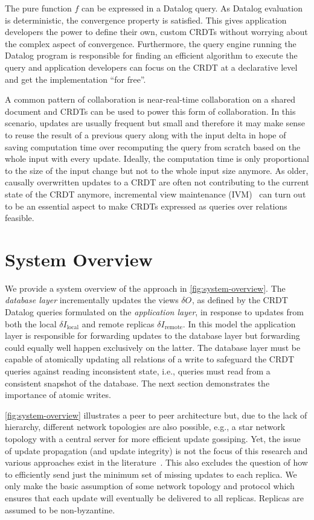 \documentclass{article}
\newcommand{\deltaI}[1]{\(\delta I_{\text{#1}}\)}
\newcommand{\deltaO}[1][]{\(\delta O_{\text{#1}}\)}
\begin{document}
The pure function \( f \) can be expressed in a Datalog query.
As Datalog evaluation is deterministic, the convergence property is satisfied.
This gives application developers the power to define their own, custom CRDTs
without worrying about the complex aspect of convergence.
Furthermore, the query engine running the Datalog program is responsible
for finding an efficient algorithm to execute the query and application developers
can focus on the CRDT at a declarative level and get the implementation ``for free''.

A common pattern of collaboration is near-real-time collaboration on a shared
document and CRDTs can be used to power this form of collaboration.
In this scenario, updates are usually frequent but small and therefore it
may make sense to reuse the result of a previous query along with the input
delta in hope of saving computation time over recomputing the query from scratch
based on the whole input with every update.
Ideally, the computation time is only proportional to the size of the input
change but not to the whole input size anymore.
As older, causally overwritten updates to a CRDT are often not contributing
to the current state of the CRDT anymore, incremental view
maintenance (IVM)~\cite{mcsherry2013differential, budiu2022dbsp, budiu2024dbsp}
can turn out to be an essential aspect to make CRDTs expressed as
queries over relations feasible.

\section{System Overview}
\label{sec:system-overview}

We provide a system overview of the approach in \autoref{fig:system-overview}.
The \emph{database layer} incrementally updates the views \deltaO{},
as defined by the CRDT Datalog queries formulated on the \emph{application layer},
in response to updates from both the local \deltaI{local} and remote replicas
\deltaI{remote}.
In this model the application layer is responsible for forwarding updates
to the database layer but forwarding could equally well happen exclusively
on the latter.
The database layer must be capable of atomically updating all relations
of a write to safeguard the CRDT queries against reading inconsistent
state, i.e., queries must read from a consistent snapshot of the database.
The next section demonstrates the importance of atomic writes.

\autoref{fig:system-overview} illustrates a peer to peer architecture
but, due to the lack of hierarchy, different network topologies are also possible,
e.g., a star network topology with a central server for more efficient update
gossiping.
Yet, the issue of update propagation (and update integrity) is not the focus
of this research and various approaches exist in the literature~\cite{
    auvolat2019merkle, sanjuan2020merkle, kleppmann2024bluesky,
    kleppmann2022making
}.
This also excludes the question of how to efficiently send just the minimum
set of missing updates to each replica.
We only make the basic assumption of some network topology and protocol
which ensures that each update will eventually be delivered to all replicas.
Replicas are assumed to be non-byzantine.
\end{document}
